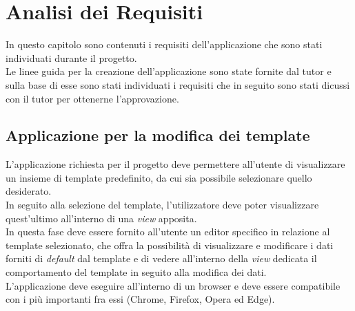 
\chapter{Analisi dei Requisiti}
\label{cap:analisi-dei-requisiti}
In questo capitolo sono contenuti i requisiti dell'applicazione che sono stati individuati durante il progetto.\\
Le linee guida per la creazione dell'applicazione sono state fornite dal tutor e sulla base di esse sono stati individuati i requisiti che in seguito sono stati dicussi con il tutor per ottenerne l'approvazione.

\section{Applicazione per la modifica dei template}
L'applicazione richiesta per il progetto deve permettere all'utente di visualizzare un insieme di template predefinito, da cui sia possibile selezionare quello desiderato.\\
In seguito alla selezione del template, l'utilizzatore deve poter visualizzare quest'ultimo all'interno di una \textit{view} apposita.\\
In questa fase deve essere fornito all'utente un editor specifico in relazione al template selezionato, che offra la possibilità di visualizzare e modificare i dati forniti di \textit{default} dal template e di vedere all'interno della \textit{view} dedicata il comportamento del template in seguito alla modifica dei dati.\\
L'applicazione deve eseguire all'interno di un browser e deve essere compatibile con i più importanti fra essi (Chrome, Firefox, Opera ed Edge).
